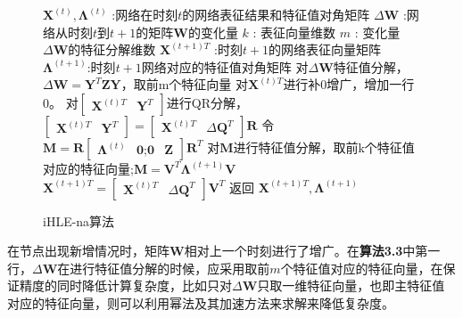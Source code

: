 \begin{figure}[htb]
	\centering
	\begin{minipage}{.7\linewidth}
		\begin{algorithm}[H]\label{iHLE_na}
			\small
			\caption{iHLE-na算法}
			\begin{algorithmic}[1]
				\Require
				\Statex $\textbf{X} ^{(t)},\bm{\Lambda}^{(t)}$ :网络在时刻$t$的网络表征结果和特征值对角矩阵
				\Statex $\Delta\textbf{W}$ :网络从时刻$t$到$t+1$的矩阵$\textbf{W}$的变化量
				\Statex $k$ : 表征向量维数
				\Statex $m$ : 变化量$\Delta\textbf{W}$的特征分解维数
				\Ensure
				\Statex $\textbf{X}^{(t+1)T}$ :时刻$t+1$的网络表征向量矩阵
				\Statex $\bm{\Lambda}^{(t+1)}$:时刻$t+1$网络对应的特征值对角矩阵
				\Statex
				\State 对$\Delta\textbf{W}$特征值分解，$\Delta\textbf{W} =  \textbf{Y}^{T} \textbf{Z}  \textbf{Y}$，取前m个特征向量
				\State 对$ \textbf{X}^{(t)T}$进行补0增广，增加一行0。
				\State 对$\begin{bmatrix} \textbf{X}^{(t)T} & \textbf{Y}^{T}\end{bmatrix}$进行QR分解，$\begin{bmatrix} \textbf{X}^{(t)T} & \textbf{Y}^{T}\end{bmatrix} = \begin{bmatrix} \textbf{X}^{(t)T} & \Delta\textbf{Q}^{T} \end{bmatrix} \textbf{R}$
				\State 令$\textbf{M} = \textbf{R}\begin{bmatrix}  \bm{\Lambda}^{(t)} & \textbf{0};
				\textbf{0} & \textbf{Z} \end{bmatrix}
				\textbf{R}^T$
				\State 对$\textbf{M}$进行特征值分解，取前k个特征值对应的特征向量;$\textbf{M} =\textbf{V}^T \bm{\Lambda}^{(t+1)} \textbf{V}$
				\State $\textbf{X}^{(t+1)T} = \begin{bmatrix} \textbf{X}^{(t)T} & \Delta\textbf{Q}^{T} \end{bmatrix} \textbf{V}^T$
				\State 返回 $\textbf{X}^{(t+1)T}, \bm{\Lambda}^{(t+1)}$
			\end{algorithmic}
		\end{algorithm}
	\end{minipage}
\end{figure}
在节点出现新增情况时，矩阵\textbf{W}相对上一个时刻进行了增广。在\textbf{算法3.3}中第一行，$\Delta\textbf{W}$在进行特征值分解的时候，应采用取前$m$个特征值对应的特征向量，在保证精度的同时降低计算复杂度，比如只对$\Delta\textbf{W}$只取一维特征向量，也即主特征值对应的特征向量，则可以利用幂法及其加速方法来求解来降低复杂度。 

